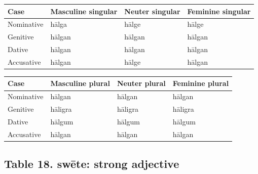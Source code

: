 \par\begingroup
\fontsize{10.5}{13.2}\selectfont
\setlength{\LTleft}{0pt}\setlength{\LTright}{\fill}
\noindent
\begin{tabular}{@{}>{\raggedright\arraybackslash}p{22.0mm}>{\raggedright\arraybackslash}p{31.188mm}>{\raggedright\arraybackslash}p{31.188mm}>{\raggedright\arraybackslash}p{31.188mm}@{}}
\toprule
\textbf{Case} & \textbf{Masculine singular} & \textbf{Neuter singular} & \textbf{Feminine singular} \\
\midrule
Nominative & hālga & hālge & hālge \\
Genitive & hālgan & hālgan & hālgan \\
Dative & hālgan & hālgan & hālgan \\
Accusative & hālgan & hālge & hālgan \\
\bottomrule
\end{tabular}
\par\endgroup
\par\addvspace{5pt}
\par\begingroup
\fontsize{10.5}{13.2}\selectfont
\setlength{\LTleft}{0pt}\setlength{\LTright}{\fill}
\noindent
\begin{tabular}{@{}>{\raggedright\arraybackslash}p{22.0mm}>{\raggedright\arraybackslash}p{31.188mm}>{\raggedright\arraybackslash}p{31.188mm}>{\raggedright\arraybackslash}p{31.188mm}@{}}
\toprule
\textbf{Case} & \textbf{Masculine plural} & \textbf{Neuter plural} & \textbf{Feminine plural} \\
\midrule
Nominative & hālgan & hālgan & hālgan \\
Genitive & hāligra & hāligra & hāligra \\
Dative & hālgum & hālgum & hālgum \\
Accusative & hālgan & hālgan & hālgan \\
\bottomrule
\end{tabular}
\par\endgroup

\subsection*{Table 18. swēte: strong adjective}

